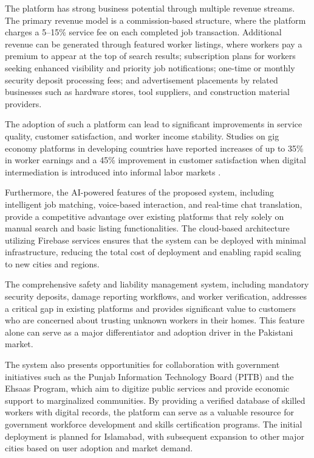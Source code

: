 \documentclass[12pt,a4paper]{report}
\begin{document}
The platform has strong business potential through multiple revenue streams. The
primary revenue model is a commission-based structure, where the platform charges
a 5--15\% service fee on each completed job transaction. Additional revenue can
be generated through featured worker listings, where workers pay a premium to
appear at the top of search results; subscription plans for workers seeking
enhanced visibility and priority job notifications; one-time or monthly security
deposit processing fees; and advertisement placements by related businesses such
as hardware stores, tool suppliers, and construction material providers.

The adoption of such a platform can lead to significant improvements in service
quality, customer satisfaction, and worker income stability. Studies on gig
economy platforms in developing countries have reported increases of up to 35\%
in worker earnings and a 45\% improvement in customer satisfaction when digital
intermediation is introduced into informal labor markets \cite{worldbank}.

Furthermore, the AI-powered features of the proposed system, including
intelligent job matching, voice-based interaction, and real-time chat
translation, provide a competitive advantage over existing platforms that rely
solely on manual search and basic listing functionalities. The cloud-based
architecture utilizing Firebase services ensures that the system can be deployed
with minimal infrastructure, reducing the total cost of deployment and enabling
rapid scaling to new cities and regions.

The comprehensive safety and liability management system, including mandatory
security deposits, damage reporting workflows, and worker verification, addresses
a critical gap in existing platforms and provides significant value to customers
who are concerned about trusting unknown workers in their homes. This feature
alone can serve as a major differentiator and adoption driver in the Pakistani
market.

The system also presents opportunities for collaboration with government
initiatives such as the Punjab Information Technology Board (PITB) and the
Ehsaas Program, which aim to digitize public services and provide economic
support to marginalized communities. By providing a verified database of skilled
workers with digital records, the platform can serve as a valuable resource for
government workforce development and skills certification programs. The initial
deployment is planned for Islamabad, with subsequent expansion to other major
cities based on user adoption and market demand.
\end{document}

